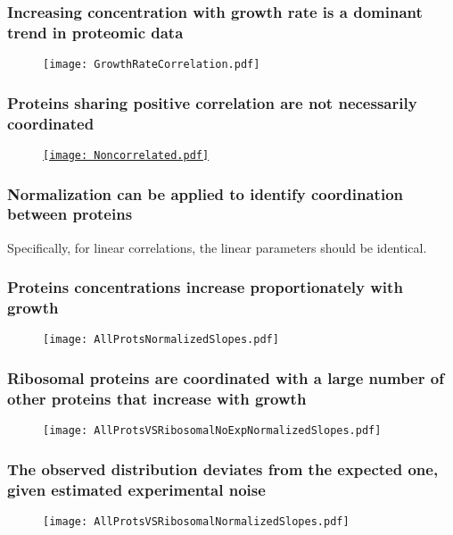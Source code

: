 \documentclass{beamer}
\begin{document}
\begin{frame}
\frametitle{Increasing concentration with growth rate is a dominant trend in proteomic data}
\begin{figure}[h!]
\centering
\texttt{[image: GrowthRateCorrelation.pdf]}
\end{figure}
\end{frame}

\begin{frame}
\frametitle{Proteins sharing positive correlation are not necessarily coordinated}
\begin{figure}[h!]
\centering
\href{https://plot.ly/~uri.barenholz/0/protein-concentration-vs-growth-rate/}
    {\texttt{[image: Noncorrelated.pdf]}}
\end{figure}
\end{frame}

\begin{frame}
\frametitle{Normalization can be applied to identify coordination between proteins}
Specifically, for linear correlations, the linear parameters should be identical.
\end{frame}

\begin{frame}
\frametitle{Proteins concentrations increase proportionately with growth}
\begin{figure}[h!]
\centering
\texttt{[image: AllProtsNormalizedSlopes.pdf]}
\end{figure}
\end{frame}

\begin{frame}
\frametitle{Ribosomal proteins are coordinated with a large number of other proteins that increase with growth}
\begin{figure}[h!]
\centering
\texttt{[image: AllProtsVSRibosomalNoExpNormalizedSlopes.pdf]}
\end{figure}
\end{frame}

\begin{frame}
\frametitle{The observed distribution deviates from the expected one, given estimated experimental noise}
\begin{figure}[h!]
\centering
\texttt{[image: AllProtsVSRibosomalNormalizedSlopes.pdf]}
\end{figure}
\end{frame}
\end{document}
